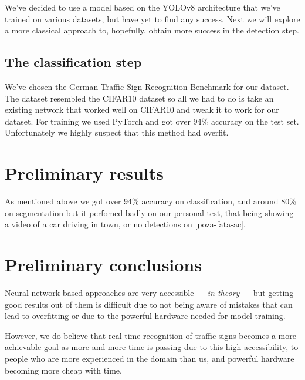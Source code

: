 \documentclass[conference]{IEEEtran}
\begin{document}
We've decided to use a model based on the YOLOv8 architecture that we've trained on various
datasets, but have yet to find any success. Next we will explore a more classical approach
to, hopefully, obtain more success in the detection step.

\subsection{The classification step}

We've chosen the German Traffic Sign Recognition Benchmark\cite{Houben-IJCNN-2013} for our dataset.
The dataset resembled the CIFAR10 dataset so all we had to do is take an existing network
that worked well on CIFAR10 and tweak it to work for our dataset. For training we used
PyTorch\cite{Paszke_PyTorch_An_Imperative_2019} and got over 94\% accuracy on the test set. Unfortunately we highly suspect that
this method had overfit.

\section{Preliminary results}

As mentioned above we got over 94\% accuracy on classification, and around 80\%
on segmentation but it perfomed badly on our personal test, that being showing a video of
a car driving in town, or no detections on \ref{poza-fata-ac}.

\section{Preliminary conclusions}

Neural-network-based approaches are very accessible --- \emph{in theory} --- but getting good
results out of them is difficult due to not being aware of mistakes that can lead to overfitting
or due to the powerful hardware needed for model training.

However, we do believe that real-time recognition of traffic signs becomes a more achievable goal
as more and more time is passing due to this high accessibility, to people who are more experienced
in the domain than us, and powerful hardware becoming more cheap with time.


\end{document}
